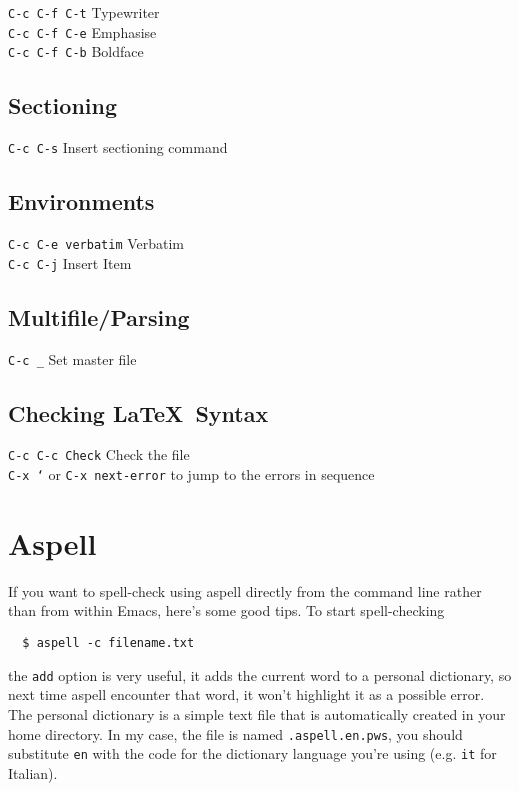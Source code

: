 \documentclass[a4paper,12pt]{report}
\begin{document}
\texttt{C-c C-f C-t} Typewriter \\

\texttt{C-c C-f C-e} Emphasise \\

\texttt{C-c C-f C-b} Boldface \\


\section{Sectioning}
\label{sec:sec}

\texttt{C-c C-s} Insert sectioning command\\

\section{Environments}

\texttt{C-c C-e verbatim} Verbatim \\

\texttt{C-c C-j} Insert Item\\


\section{Multifile/Parsing}
\label{sec:multi}

\texttt{C-c \_} Set master file\\


\section{Checking \LaTeX\ Syntax}

\texttt{C-c C-c Check} Check the file\\

\texttt{C-x `} or \texttt{C-x next-error} to jump to the errors in sequence \\


\chapter{Aspell}
\label{chap:aspell}

If you want to spell-check using aspell directly from the command line rather than from within Emacs, here's some good tips. To start spell-checking
\begin{verbatim}
  $ aspell -c filename.txt
\end{verbatim}
the \texttt{add} option is very useful, it adds the current word to a personal dictionary, so next time aspell encounter that word, it won't highlight it as a possible error. The personal dictionary is a simple text file that is automatically created in your home directory. In my case, the file is named \verb+.aspell.en.pws+, you should substitute \verb+en+ with the code for the dictionary language you're using (e.g. \verb+it+ for Italian).
\end{document}
